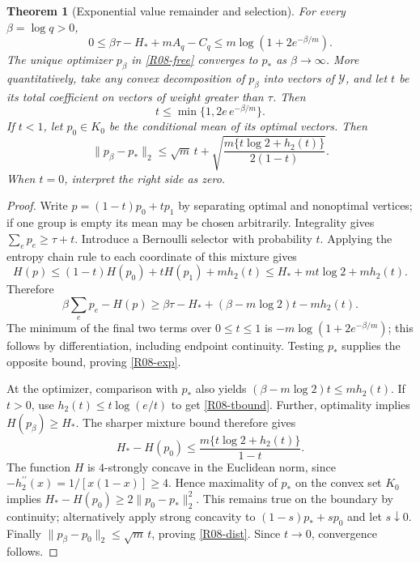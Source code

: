 \documentclass[11pt,a4paper]{article}
\newtheorem{theorem}{Theorem}[section]
\theoremstyle{definition}\newtheorem{definition}[theorem]{Definition}
\theoremstyle{remark}\newtheorem{remark}[theorem]{Remark}
\numberwithin{equation}{section}
\begin{document}
\begin{theorem}[Exponential value remainder and selection]\label{R08-temperature}
For every $\beta=\log q>0$,
\begin{equation}\label{R08-exp}
 0\le \beta\tau-H_*+mA_q-C_q
 \le m\log(1+2e^{-\beta/m}).
\end{equation}
The unique optimizer $p_\beta$ in \eqref{R08-free} converges to $p_*$ as $\beta\to\infty$. More quantitatively, take any convex decomposition of $p_\beta$ into vectors of $\mathcal Y$, and let $t$ be its total coefficient on vectors of weight greater than $\tau$. Then
\begin{equation}\label{R08-tbound}t\le\min\{1,2e\,e^{-\beta/m}\}.
\end{equation}
If $t<1$, let $p_0\in K_0$ be the conditional mean of its optimal vectors. Then
\begin{equation}\label{R08-dist}
 \|p_\beta-p_*\|_2\le\sqrt m\,t+
 \sqrt{\frac{m\{t\log2+h_2(t)\}}{2(1-t)}}.
\end{equation}
When $t=0$, interpret the right side as zero.
\end{theorem}
\begin{proof}
Write $p=(1-t)p_0+tp_1$ by separating optimal and nonoptimal vertices; if one group is empty its mean may be chosen arbitrarily. Integrality gives $\sum_ep_e\ge\tau+t$. Introduce a Bernoulli selector with probability $t$. Applying the entropy chain rule to each coordinate of this mixture gives
\[
 H(p)\le(1-t)H(p_0)+tH(p_1)+mh_2(t)
 \le H_*+mt\log2+mh_2(t).
\]
Therefore
\[
 \beta\sum_ep_e-H(p)\ge\beta\tau-H_*+
 (\beta-m\log2)t-mh_2(t).
\]
The minimum of the final two terms over $0\le t\le1$ is
$-m\log(1+2e^{-\beta/m})$; this follows by differentiation, including endpoint continuity. Testing $p_*$ supplies the opposite bound, proving \eqref{R08-exp}.

At the optimizer, comparison with $p_*$ also yields
$(\beta-m\log2)t\le mh_2(t)$. If $t>0$, use $h_2(t)\le t\log(e/t)$ to get \eqref{R08-tbound}. Further, optimality implies $H(p_\beta)\ge H_*$. The sharper mixture bound therefore gives
\[
 H_*-H(p_0)\le\frac{m\{t\log2+h_2(t)\}}{1-t}.
\]
The function $H$ is $4$-strongly concave in the Euclidean norm, since $-h_2^{\prime\prime}(x)=1/[x(1-x)]\ge4$. Hence maximality of $p_*$ on the convex set $K_0$ implies
$H_*-H(p_0)\ge2\|p_0-p_*\|_2^2$. This remains true on the boundary by continuity; alternatively apply strong concavity to $(1-s)p_*+sp_0$ and let $s\downarrow0$. Finally $\|p_\beta-p_0\|_2\le\sqrt m\,t$, proving \eqref{R08-dist}. Since $t\to0$, convergence follows.
\end{proof}
\end{document}
